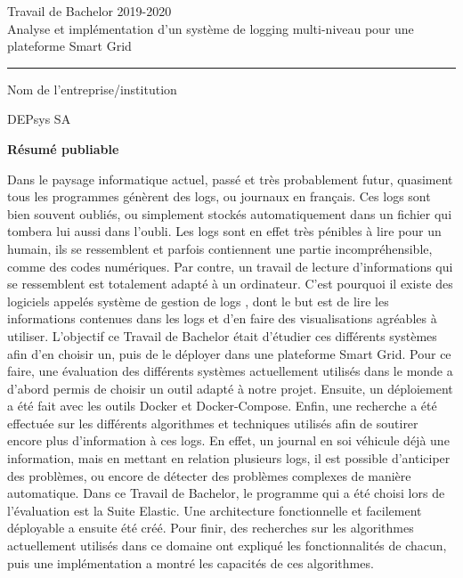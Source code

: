 \documentclass[paper=a4, fontsize=11pt]{scrartcl}
\begin{document}
  \vspace{0.6cm}
  
  \begin{center}
      {\large Travail de Bachelor 2019-2020 \\[0.2cm]}
      {Analyse et implémentation d’un système de logging multi-niveau pour une plateforme Smart Grid\\[0.5cm]}
  \end{center}
  
  \hrule
  \vspace{0.5cm}
  
  {Nom de l'entreprise/institution}

  DEPsys SA

  \vspace{0.5cm}
  
  {\bfseries Résumé publiable}
  
  {Dans le paysage informatique actuel, passé et très probablement futur, quasiment tous les programmes génèrent des logs, ou journaux en français. Ces logs sont bien souvent oubliés, ou simplement stockés automatiquement dans un fichier qui tombera lui aussi dans l'oubli. Les logs sont en effet très pénibles à lire pour un humain, ils se ressemblent et parfois contiennent une partie incompréhensible, comme des codes numériques.\newline
  Par contre, un travail de lecture d'informations qui se ressemblent est totalement adapté à un ordinateur. C'est pourquoi il existe des logiciels appelés \og système de gestion de logs \fg, dont le but est de lire les informations contenues dans les logs et d'en faire des visualisations agréables à utiliser. L'objectif ce Travail de Bachelor était d'étudier ces différents systèmes afin d'en choisir un, puis de le déployer dans une plateforme Smart Grid.\newline
  Pour ce faire, une évaluation des différents systèmes actuellement utilisés dans le monde a d'abord permis de choisir un outil adapté à notre projet. Ensuite, un déploiement a été fait avec les outils Docker et Docker-Compose. Enfin, une recherche a été effectuée sur les différents algorithmes et techniques utilisés afin de soutirer encore plus d'information à ces logs. En effet, un journal en soi véhicule déjà une information, mais en mettant en relation plusieurs logs, il est possible d'anticiper des problèmes, ou encore de détecter des problèmes complexes de manière automatique. \newline
  Dans ce Travail de Bachelor, le programme qui a été choisi lors de l'évaluation est la Suite Elastic. Une architecture fonctionnelle et facilement déployable a ensuite été créé. Pour finir, des recherches sur les algorithmes actuellement utilisés dans ce domaine ont expliqué les fonctionnalités de chacun, puis une implémentation a montré les capacités de ces algorithmes.}
\end{document}
